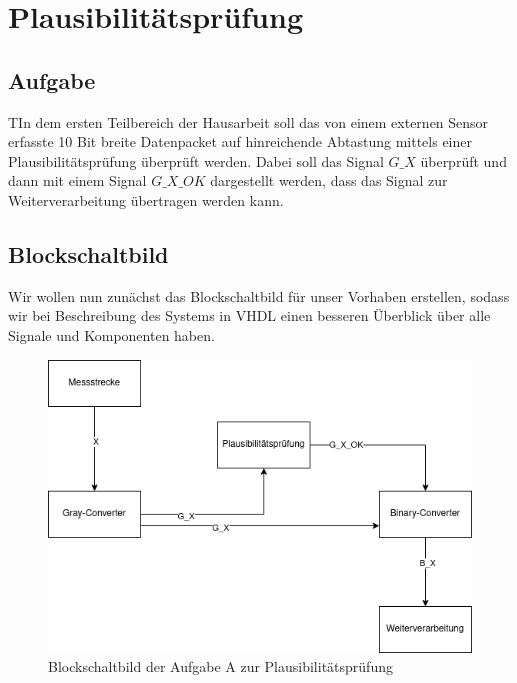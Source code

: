 \documentclass{report}
\begin{document}
\newpage


\tableofcontents

\listoffigures

\listoflistings

\newpage
\renewcommand{\thechapter}{A}

\chapter{Plausibilitätsprüfung}
\label{cha:teil-plausibilitat}
\newpage
\section{Aufgabe}
\label{sec:einleitung}

\begin{task}
  TIn dem ersten Teilbereich der Hausarbeit soll das von einem externen Sensor erfasste 10 Bit breite Datenpacket auf hinreichende Abtastung mittels einer Plausibilitätsprüfung überprüft werden. Dabei soll das Signal $G\_X$ überprüft und dann mit einem Signal $G\_X\_OK$ dargestellt werden, dass das Signal zur Weiterverarbeitung übertragen werden kann.
\end{task}

\section{Blockschaltbild}
\label{sec:blockschaltbild}

Wir wollen nun zunächst das Blockschaltbild für unser Vorhaben erstellen, sodass wir bei Beschreibung des Systems in VHDL einen besseren Überblick über alle Signale und Komponenten haben.

\begin{figure}[h]
  \centering
  \includegraphics[width=\textwidth]{../assets/images/DIHA/blockschaltbilda.png}
  \caption{Blockschaltbild der Aufgabe A zur Plausibilitätsprüfung}
  \label{fig:blockA}
\end{figure}
\end{document}
